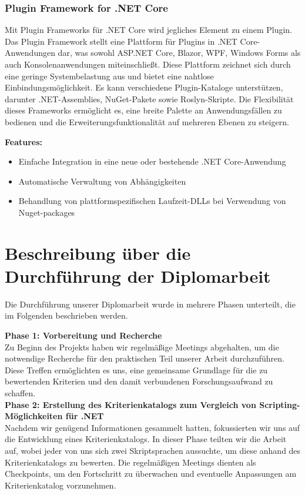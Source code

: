 \subsubsection*{Plugin Framework for .NET Core}

Mit Plugin Frameworks für .NET Core wird jegliches Element zu einem Plugin. Das Plugin 
Framework stellt eine Plattform für Plugins in .NET Core-Anwendungen dar, was 
sowohl ASP.NET Core, Blazor, WPF, Windows Forms als auch Konsolenanwendungen miteinschließt. 
Diese Plattform zeichnet sich durch eine geringe Systembelastung aus und bietet eine nahtlose 
Einbindungsmöglichkeit. Es kann verschiedene Plugin-Kataloge unterstützen, 
darunter .NET-Assemblies, NuGet-Pakete sowie Roslyn-Skripte. 
Die Flexibilität dieses Frameworks ermöglicht es, eine breite Palette an Anwendungsfällen 
zu bedienen und die Erweiterungsfunktionalität auf mehreren Ebenen zu steigern. \cite{pluginframework}

\textbf{Features:}
\begin{itemize}
    \item Einfache Integration in eine neue oder bestehende .NET Core-Anwendung
    \item Automatische Verwaltung von Abhängigkeiten
    \item Behandlung von plattformspezifischen Laufzeit-DLLs bei Verwendung von Nuget-packages
\end{itemize}
\cite{pluginframework}

\newpage
\section{Beschreibung über die Durchführung der Diplomarbeit}

Die Durchführung unserer Diplomarbeit wurde in mehrere Phasen unterteilt, 
die im Folgenden beschrieben werden.

\textbf{Phase 1: Vorbereitung und Recherche}\\
Zu Beginn des Projekts haben wir regelmäßige Meetings abgehalten, um die notwendige 
Recherche für den praktischen Teil unserer Arbeit durchzuführen. Diese Treffen 
ermöglichten es uns, eine gemeinsame Grundlage für die zu bewertenden Kriterien und 
den damit verbundenen Forschungsaufwand zu schaffen.\\

\textbf{Phase 2: Erstellung des Kriterienkatalogs zum Vergleich von Scripting-Möglichkeiten für .NET}\\
Nachdem wir genügend Informationen gesammelt hatten, fokussierten wir uns auf 
die Entwicklung eines Kriterienkatalogs. In dieser Phase teilten wir die Arbeit auf, 
wobei jeder von uns sich zwei Skriptsprachen aussuchte, um diese anhand des 
Kriterienkatalogs zu bewerten. Die regelmäßigen Meetings dienten als Checkpoints, 
um den Fortschritt zu überwachen und eventuelle Anpassungen am Kriterienkatalog vorzunehmen.\\

